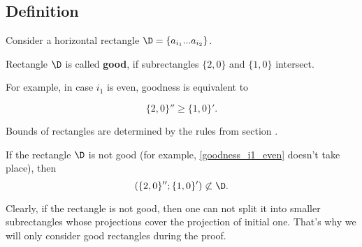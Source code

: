 \subsection{Definition}

Consider a horizontal rectangle $\D = \left\{ a_{i_1} ... a_{i_2} \right\}$.

\begin{definition}
	Rectangle $\D$ is called \textbf{good},
	if subrectangles
	$\{2, 0\}$ and $\{1, 0\}$ intersect.
\end{definition}


For example, in case $i_1$ is even, goodness is equivalent to

\begin{equation}\label{goodness_i1_even}
	\{2, 0\}'' \geqslant \{1, 0\}'.
\end{equation}

Bounds of rectangles are determined by the rules from section .

If the rectangle $\D$ is not good (for example, \ref{goodness_i1_even} doesn't take place), then
$$ ( \{2, 0\}'' ; \{1, 0\}' ) \not\subset \D. $$

Clearly, if the rectangle is not good,
then one can not split it into smaller subrectangles whose projections cover the projection of initial one.
That's why we will only consider good rectangles during the proof.

